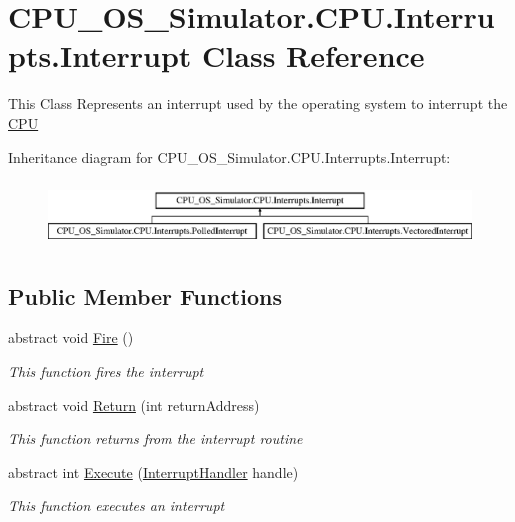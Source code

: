 \hypertarget{class_c_p_u___o_s___simulator_1_1_c_p_u_1_1_interrupts_1_1_interrupt}{}\section{C\+P\+U\+\_\+\+O\+S\+\_\+\+Simulator.\+C\+P\+U.\+Interrupts.\+Interrupt Class Reference}
\label{class_c_p_u___o_s___simulator_1_1_c_p_u_1_1_interrupts_1_1_interrupt}


This Class Represents an interrupt used by the operating system to interrupt the \hyperlink{namespace_c_p_u___o_s___simulator_1_1_c_p_u}{C\+P\+U}  


Inheritance diagram for C\+P\+U\+\_\+\+O\+S\+\_\+\+Simulator.\+C\+P\+U.\+Interrupts.\+Interrupt\+:\begin{figure}[H]
\begin{center}
\leavevmode
\includegraphics[height=1.761006cm]{class_c_p_u___o_s___simulator_1_1_c_p_u_1_1_interrupts_1_1_interrupt}
\end{center}
\end{figure}
\subsection*{Public Member Functions}
\begin{DoxyCompactItemize}
\item 
abstract void \hyperlink{class_c_p_u___o_s___simulator_1_1_c_p_u_1_1_interrupts_1_1_interrupt_abde7097975761eede85d20ce9f3ea25d}{Fire} ()
\begin{DoxyCompactList}\small\item\em This function fires the interrupt \end{DoxyCompactList}\item 
abstract void \hyperlink{class_c_p_u___o_s___simulator_1_1_c_p_u_1_1_interrupts_1_1_interrupt_a2890d737f4bbc4dad7bd5f4842503a16}{Return} (int return\+Address)
\begin{DoxyCompactList}\small\item\em This function returns from the interrupt routine \end{DoxyCompactList}\item 
abstract int \hyperlink{class_c_p_u___o_s___simulator_1_1_c_p_u_1_1_interrupts_1_1_interrupt_a8728fdaeedac9a6ce6e83bec5738a963}{Execute} (\hyperlink{class_c_p_u___o_s___simulator_1_1_c_p_u_1_1_interrupts_1_1_interrupt_handler}{Interrupt\+Handler} handle)
\begin{DoxyCompactList}\small\item\em This function executes an interrupt \end{DoxyCompactList}\end{DoxyCompactItemize}
